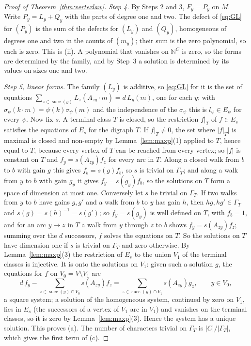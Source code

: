 \begin{proof}[Proof of Theorem~\ref{thm:vertexlaw}]
\emph{Step 4.} By Steps 2 and 3, $F_y=P_y$ on $M$. Write $P_y=L_y+Q_y$ with the parts of degree one and two. The defect of \eqref{eq:GL} for $(P_y)$ is the sum of the defects for $(L_y)$ and $(Q_y)$, homogeneous of degrees one and two in the counts of $(m_y)$; their sum is the zero polynomial, so each is zero. This is (ii). A polynomial that vanishes on $\mathbb{N}^C$ is zero, so the forms are determined by the family, and by Step~3 a solution is determined by its values on sizes one and two.

\emph{Step 5, linear forms.} The family $(L_y)$ is additive, so \eqref{eq:GL} for it is the set of equations $\sum_{z\in\operatorname{succ}(y)}L_z(A_{zy}\cdot m)=d\,L_y(m)$, one for each $y$; with $\sigma_\psi(k\cdot m)=\psi(k)\sigma_\psi(m)$ and the independence of the $\sigma_\psi$ this is $l_\psi\in E_\psi$ for every $\psi$. Now fix $s$. A terminal class $T$ is closed, so the restriction $f|_T$ of $f\in E_s$ satisfies the equations of $E_s$ for the digraph $T$. If $f|_T\ne0$, the set where $|f|_T|$ is maximal is closed and non-empty by Lemma~\ref{lem:maxp}(1) applied to $T$, hence equal to $T$, because every vertex of $T$ can be reached from every vertex; so $|f|$ is constant on $T$ and $f_y=s(A_{zy})f_z$ for every arc in $T$. Along a closed walk from $b$ to $b$ with gain $g$ this gives $f_b=s(g)f_b$, so $s$ is trivial on $\Gamma_T$; and along a walk from $y$ to $b$ with gain $g_y$ it gives $f_y=s(g_y)f_b$, so the solutions on $T$ form a space of dimension at most one. Conversely let $s$ be trivial on $\Gamma_T$. If two walks from $y$ to $b$ have gains $g,g'$ and a walk from $b$ to $y$ has gain $h$, then $hg,hg'\in\Gamma_T$ and $s(g)=s(h)^{-1}=s(g')$; so $f_y=s(g_y)$ is well defined on $T$, with $f_b=1$, and for an arc $y\to z$ in $T$ a walk from $y$ through $z$ to $b$ shows $f_y=s(A_{zy})f_z$; summing over the $d$ successors, $f$ solves the equations on $T$. So the solutions on $T$ have dimension one if $s$ is trivial on $\Gamma_T$ and zero otherwise. By Lemma~\ref{lem:maxp}(3) the restriction of $E_s$ to the union $V_1$ of the terminal classes is injective. It is onto the solutions on $V_1$: given such a solution $g$, the equations for $f$ on $V_0=V\setminus V_1$ are
\[
d\,f_y-\sum_{z\in\operatorname{succ}(y)\cap V_0}s(A_{zy})f_z=\sum_{z\in\operatorname{succ}(y)\cap V_1}s(A_{zy})g_z,\qquad y\in V_0,
\]
a square system; a solution of the homogeneous system, continued by zero on $V_1$, lies in $E_s$ (the successors of a vertex of $V_1$ are in $V_1$) and vanishes on the terminal classes, so it is zero by Lemma~\ref{lem:maxp}(3). Hence the system has a unique solution. This proves (a). The number of characters trivial on $\Gamma_T$ is $|C|/|\Gamma_T|$, which gives the first term of (c).


\end{proof}
